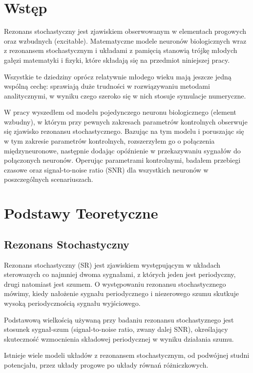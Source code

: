 \documentclass[12pt]{article}
\begin{document}
  \section{Wstęp}
  Rezonans stochastyczny jest zjawiskiem obserwowanym w elementach progowych oraz wzbudnych (excitable). Matematyczne modele neuronów biologicznych wraz z rezonansem stochastycznym i układami z pamięcią stanowią trójkę młodych gałęzi matematyki i fizyki, które składają się na przedmiot niniejszej pracy.
  
  Wszystkie te dziedziny oprócz relatywnie młodego wieku mają jeszcze jedną wspólną cechę: sprawiają duże trudności w rozwiązywaniu metodami analitycznymi, w wyniku czego szeroko się w nich stosuje symulacje numeryczne.
  
  W pracy wyszedłem od modelu pojedynczego neuronu biologicznego (element wzbudny), w którym przy pewnych zakresach parametrów kontrolnych obserwuje się zjawisko rezonansu stochastycznego. Bazując na tym modelu i poruszając się w tym zakresie parametrów kontrolnych, rozszerzyłem go o połączenia międzyneuronowe, następnie dodając opóźnienie w przekazywaniu sygnałów do połączonych neuronów. Operując parametrami kontrolnymi, badałem przebiegi czasowe oraz signal-to-noise ratio (SNR) dla wszystkich neuronów w poszczególnych scenariuszach. 
  
  
  \section{Podstawy Teoretyczne}
  
  \subsection{Rezonans Stochastyczny}
  
  Rezonans stochastyczny (SR) jest zjawiskiem występującym w układach sterowanych co najmniej dwoma sygnałami, z których jeden jest periodyczny, drugi natomiast jest szumem. O występowaniu rezonansu stochastycznego mówimy, kiedy nałożenie sygnału periodycznego i niezerowego szumu skutkuje wysoką periodycznością sygnału wyjściowego.
  
  Podstawową wielkością używaną przy badaniu rezonansu stochastyznego jest stosunek sygnał-szum (signal-to-noise ratio, zwany dalej SNR), określający skuteczność wzmocnienia składowej periodycznej w wyniku działania szumu.
  
  Istnieje wiele modeli układów z rezonansem stochastycznym, od podwójnej studni potencjału, przez układy progowe po układy równań różniczkowych.
  
\end{document}
